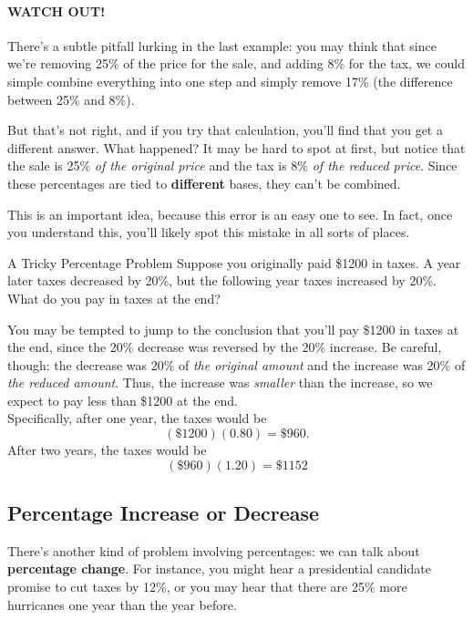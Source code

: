 \paragraph{WATCH OUT!} There's a subtle pitfall lurking in the last example: you may think that since we're removing 25\% of the price for the sale, and adding 8\% for the tax, we could simple combine everything into one step and simply remove 17\% (the difference between 25\% and 8\%).

But that's not right, and if you try that calculation, you'll find that you get a different answer.  What happened?  It may be hard to spot at first, but notice that the sale is 25\% \emph{of the original price} and the tax is 8\% \emph{of the reduced price}.  Since these percentages are tied to \textbf{different} bases, they can't be combined.

This is an important idea, because this error is an easy one to see.  In fact, once you understand this, you'll likely spot this mistake in all sorts of places.

\begin{example}[https://www.youtube.com/watch?v=SOSt8uYaObc&list=PLfmpjsIzhztsZtnb7HnXrQ8SLoiOCIcAM&index=8]{A Tricky Percentage Problem}
Suppose you originally paid \$1200 in taxes.  A year later taxes decreased by 20\%, but the following year taxes increased by 20\%.  What do you pay in taxes at the end?

\sol

You may be tempted to jump to the conclusion that you'll pay \$1200 in taxes at the end, since the 20\% decrease was reversed by the 20\% increase.  Be careful, though: the decrease was 20\% of \emph{the original amount} and the increase was 20\% of \emph{the reduced amount}.  Thus, the increase was \emph{smaller} than the increase, so we expect to pay less than \$1200 at the end.\\

Specifically, after one year, the taxes would be \[(\$1200)(0.80) = \$960.\]  After two years, the taxes would be \[(\$960)(1.20) = \boxed{\$1152}\]
\end{example}

\subsection{Percentage Increase or Decrease}
There's another kind of problem involving percentages: we can talk about \textbf{percentage change}.  For instance, you might hear a presidential candidate promise to cut taxes by 12\%, or you may hear that there are 25\% more hurricanes one year than the year before.


